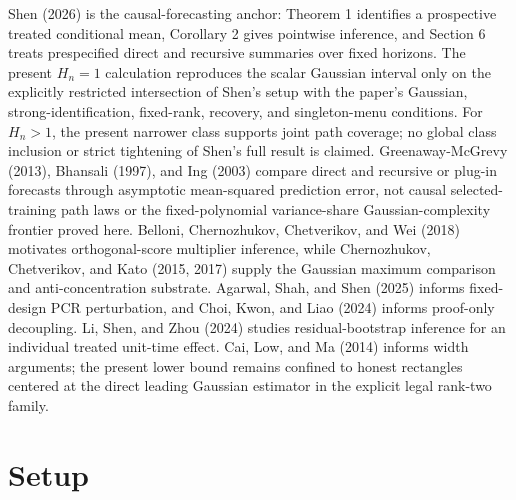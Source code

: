 \documentclass{article}
\begin{document}
Shen (2026) is the causal-forecasting anchor: Theorem 1 identifies a prospective treated conditional mean, Corollary 2 gives pointwise inference, and Section 6 treats prespecified direct and recursive summaries over fixed horizons. The present \(H_n=1\) calculation reproduces the scalar Gaussian interval only on the explicitly restricted intersection of Shen's setup with the paper's Gaussian, strong-identification, fixed-rank, recovery, and singleton-menu conditions. For \(H_n>1\), the present narrower class supports joint path coverage; no global class inclusion or strict tightening of Shen's full result is claimed. Greenaway-McGrevy (2013), Bhansali (1997), and Ing (2003) compare direct and recursive or plug-in forecasts through asymptotic mean-squared prediction error, not causal selected-training path laws or the fixed-polynomial variance-share Gaussian-complexity frontier proved here. Belloni, Chernozhukov, Chetverikov, and Wei (2018) motivates orthogonal-score multiplier inference, while Chernozhukov, Chetverikov, and Kato (2015, 2017) supply the Gaussian maximum comparison and anti-concentration substrate. Agarwal, Shah, and Shen (2025) informs fixed-design PCR perturbation, and Choi, Kwon, and Liao (2024) informs proof-only decoupling. Li, Shen, and Zhou (2024) studies residual-bootstrap inference for an individual treated unit-time effect. Cai, Low, and Ma (2014) informs width arguments; the present lower bound remains confined to honest rectangles centered at the direct leading Gaussian estimator in the explicit legal rank-two family.

\section{Setup}
\end{document}
